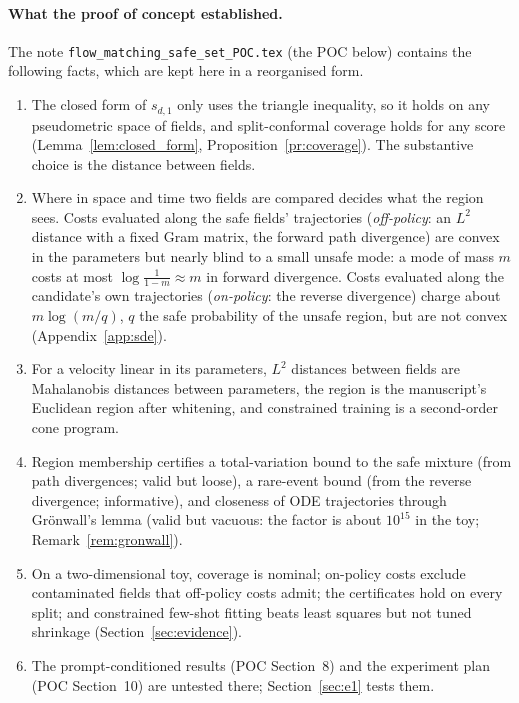 \documentclass{article}
\theoremstyle{plain}
\theoremstyle{remark}
\begin{document}
\paragraph{What the proof of concept established.}
The note \texttt{flow\_matching\_safe\_set\_POC.tex} (the POC below) contains the following
facts, which are kept here in a reorganised form.
\begin{enumerate}
\item The closed form of $s_{d,1}$ only uses the triangle inequality, so it holds on any
pseudometric space of fields, and split-conformal coverage holds for any score
(Lemma~\ref{lem:closed_form}, Proposition~\ref{pr:coverage}). The substantive choice is the
distance between fields.
\item Where in space and time two fields are compared decides what the region sees. Costs
evaluated along the safe fields' trajectories (\emph{off-policy}: an $L^2$ distance with a fixed
Gram matrix, the forward path divergence) are convex in the parameters but nearly blind to a
small unsafe mode: a mode of mass $m$ costs at most $\log\frac{1}{1-m}\approx m$ in forward
divergence. Costs evaluated along the candidate's own trajectories (\emph{on-policy}: the
reverse divergence) charge about $m\log(m/q)$, $q$ the safe probability of the unsafe region,
but are not convex (Appendix~\ref{app:sde}).
\item For a velocity linear in its parameters, $L^2$ distances between fields are Mahalanobis
distances between parameters, the region is the manuscript's Euclidean region after
whitening, and constrained training is a second-order cone program.
\item Region membership certifies a total-variation bound to the safe mixture (from path
divergences; valid but loose), a rare-event bound (from the reverse divergence; informative),
and closeness of ODE trajectories through Gr\"onwall's lemma (valid but vacuous: the factor is
about $10^{15}$ in the toy; Remark~\ref{rem:gronwall}).
\item On a two-dimensional toy, coverage is nominal; on-policy costs exclude contaminated fields
that off-policy costs admit; the certificates hold on every split; and constrained few-shot
fitting beats least squares but not tuned shrinkage (Section~\ref{sec:evidence}).
\item The prompt-conditioned results (POC Section~8) and the experiment plan (POC Section~10) are untested
there; Section~\ref{sec:e1} tests them.
\end{enumerate}
\end{document}

